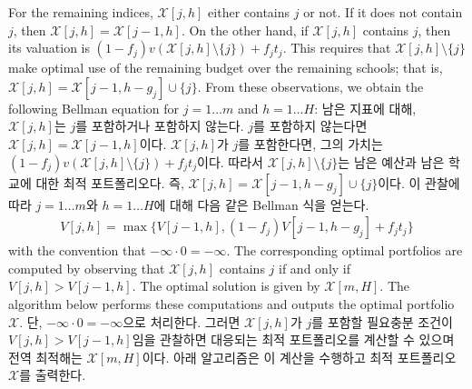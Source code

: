 \documentclass[11pt]{article} %
\theoremstyle{definition}
\theoremstyle{definition}
\begin{document}
\ifen
For the remaining indices, $\mathcal{X}[j, h]$ either contains $j$ or not. If it does not contain $j$, then $\mathcal{X}[j, h] = \mathcal{X}[j-1, h]$. On the other hand, if  $\mathcal{X}[j, h]$ contains $j$, then its valuation is $(1 - f_j) v(\mathcal{X}[j, h]\setminus \{j\}) + f_j t_j$. This requires that $\mathcal{X}[j, h]\setminus \{j\}$ make optimal use of the remaining budget over the remaining schools; that is, $\mathcal{X}[j, h] = \mathcal{X}[j-1, h - g_j] \cup\{j\}$. From these observations, we obtain the following Bellman equation for $ j = 1\dots m$ and $h = 1\dots H$:
\else
남은 지표에 대해, $\mathcal{X}[j, h]$는 $j$를 포함하거나 포함하지 않는다. $j$를 포함하지 않는다면 $\mathcal{X}[j, h] = \mathcal{X}[j-1, h]$이다. $\mathcal{X}[j, h]$가 $j$를 포함한다면, 그의 가치는  $(1 - f_j) v(\mathcal{X}[j, h]\setminus \{j\}) + f_j t_j$이다. 따라서 $\mathcal{X}[j, h]\setminus \{j\}$는 남은 예산과 남은 학교에 대한 최적 포트폴리오다. 즉,  $\mathcal{X}[j, h] = \mathcal{X}[j-1, h - g_j] \cup\{j\}$이다. 이 관찰에 따라 $ j = 1\dots m$와 $h = 1\dots H$에 대해 다음 같은 Bellman 식을 얻는다.
\fi
\begin{align}
V[j, h] = \max\bigl\{ V[j-1, h], (1 - f_j) V[j-1, h-g_j] + f_j t_j \bigr\}
\end{align}
\ifen 
with the convention that $ -\infty \cdot 0 = -\infty$. The corresponding optimal portfolios are computed by observing that $\mathcal{X}[j, h]$ contains $j$ if and only if $V[j, h]> V[j-1, h]$. The optimal solution is given by $\mathcal{X}[m, H]$. The algorithm below performs these computations and outputs the optimal portfolio $\mathcal{X}$. 
\else
단, $ -\infty \cdot 0 = -\infty$으로 처리한다. 그러면 $\mathcal{X}[j, h]$가  $j$를 포함할 필요충분 조건이 $V[j, h]> V[j-1, h]$임을 관찰하면 대응되는 최적 포트폴리오를 계산할 수 있으며 전역 최적해는 $\mathcal{X}[m, H]$이다. 아래 알고리즘은 이 계산을 수행하고 최적 포트폴리오 $\mathcal{X}$를 출력한다.
\fi
\end{document}
